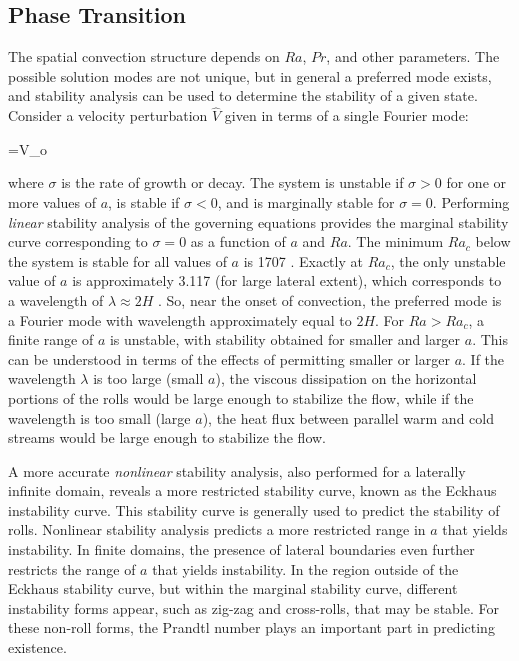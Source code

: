 \documentclass[10pt]{article}
\numberwithin{equation}{section} %
\begin{document}
\subsection{Phase Transition}

The spatial convection structure depends on \(Ra\), \(Pr\), and other parameters. The possible solution modes are not unique, but in general a preferred mode exists, and stability analysis can be used to determine the stability of a given state. Consider a velocity perturbation \(\hat{V}\) given in terms of a single Fourier mode:

\beq
{}=V_o
\eeq

where \(\sigma\) is the rate of growth or decay. The system is unstable if \(\sigma>0\) for one or more values of \(a\), is stable if \(\sigma<0\), and is marginally stable for \(\sigma=0\). Performing {\it linear} stability analysis of the governing equations provides the marginal stability curve corresponding to \(\sigma=0\) as a function of \(a\) and \(Ra\). The minimum \(Ra_c\) below the system is stable for all values of \(a\) is 1707 \cite{berge}. Exactly at \(Ra_c\), the only unstable value of \(a\) is approximately 3.117 (for large lateral extent), which corresponds to a wavelength of \(\lambda\approx2H\) \cite{sandberg}. So, near the onset of convection, the preferred mode is a Fourier mode with wavelength approximately equal to \(2H\). For \(Ra>Ra_c\), a finite range of \(a\) is unstable, with stability obtained for smaller and larger \(a\). This can be understood in terms of the effects of permitting smaller or larger \(a\). If the wavelength \(\lambda\) is too large (small \(a\)), the viscous dissipation on the horizontal portions of the rolls would be large enough to stabilize the flow, while if the wavelength is too small (large \(a\)), the heat flux between parallel warm and cold streams would be large enough to stabilize the flow.

A more accurate {\it nonlinear} stability analysis, also performed for a laterally infinite domain, reveals a more restricted stability curve, known as the Eckhaus instability curve. This stability curve is generally used to predict the stability of rolls. Nonlinear stability analysis predicts a more restricted range in \(a\) that yields instability. In finite domains, the presence of lateral boundaries even further restricts the range of \(a\) that yields instability. In the region outside of the Eckhaus stability curve, but within the marginal stability curve, different instability forms appear, such as zig-zag and cross-rolls, that may be stable. For these non-roll forms, the Prandtl number plays an important part in predicting existence.
\end{document}

